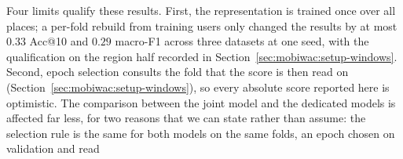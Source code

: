 Four limits qualify these results. First, the representation is trained once over all places; a
per-fold rebuild from training users only changed the results by at most $0.33$ Acc@10 and $0.29$
macro-F1 across three datasets at one seed, with the qualification on the region half recorded in
Section~\ref{sec:mobiwac:setup-windows}. Second, epoch selection consults the fold that the score is
then read on (Section~\ref{sec:mobiwac:setup-windows}), so every absolute score reported here is optimistic. The
comparison between the joint model and the dedicated models is affected far less, for two reasons that we can state
rather than assume: the selection rule is the same for both models on the same folds, an epoch chosen on validation and read
